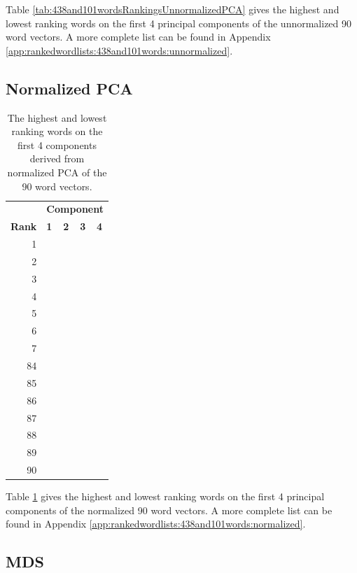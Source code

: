 \documentclass[10pt,letterpaper]{book}
\begin{document}
Table \ref{tab:438and101wordsRankingsUnnormalizedPCA} gives the highest and lowest
ranking words on the first 4 principal components of the unnormalized 90 word 
vectors. A more complete list can be found in Appendix 
\ref{app:rankedwordlists:438and101words:unnormalized}.


\subsection{Normalized PCA}

\begin{table}[!htbp]
    \begin{tabular}{| rllll | }
        \hline
         & \multicolumn{4}{c|}{\textbf{Component}} \\
        \textbf{Rank} & \textbf{1} & \textbf{2} & \textbf{3} & \textbf{4} \\
        \hline
        1 &  &  &  &  \\
        2 &  &  &  &  \\
        3 &  &  &  &  \\
        4 &  &  &  &  \\
        5 &  &  &  &  \\
        6 &  &  &  &  \\
        7 &  &  &  &  \\
        \hline
        84 &  &  &  &  \\
        85 &  &  &  &  \\
        86 &  &  &  &  \\
        87 &  &  &  &  \\
        88 &  &  &  &  \\
        89 &  &  &  &  \\
        90 &  &  &  &  \\
        \hline
    \end{tabular}
    \caption{The highest and lowest ranking words on the first 4 components 
    derived from normalized PCA of the 90 word vectors.}
    \label{tab:438and101wordsRankingsNormalizedPCA}
\end{table}

Table \ref{tab:438and101wordsRankingsNormalizedPCA} gives the highest and lowest
ranking words on the first 4 principal components of the normalized 90 word 
vectors. A more complete list can be found in Appendix 
\ref{app:rankedwordlists:438and101words:normalized}.


\subsection{MDS}
\end{document}
